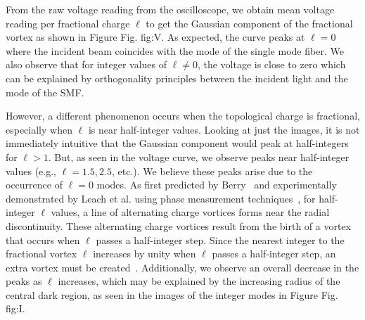 \documentclass[10pt,a4paper,twoside]{article}
\renewcommand{\l}{\ell}
\renewcommand{\ref}[1]{Fig. #1}
\begin{document}
From the raw voltage reading from the oscilloscope, we obtain mean voltage reading per fractional charge $\ell$ to get the Gaussian component of the fractional vortex as shown in Figure \ref{fig:V}. As expected, the curve peaks at $\ell = 0$ where the incident beam coincides with the mode of the single mode fiber. We also observe that for integer values of $\ell \neq 0$, the voltage is close to zero which can be explained by orthogonality principles between the incident light and the mode of the SMF. %

However, a different phenomenon occurs when the topological charge is fractional, especially when $\ell$ is near half-integer values. Looking at just the images, it is not immediately intuitive that the Gaussian component would peak at half-integers for $\ell > 1$. But, as seen in the voltage curve, we observe peaks near half-integer values (e.g., $\ell = 1.5, 2.5$, etc.). We believe these peaks arise due to the occurrence of $\ell = 0$ modes. As first predicted by Berry~\cite{Berry} and experimentally demonstrated by Leach et al. using phase measurement techniques~\cite{leach2004observation}, for half-integer $\ell$ values, a line of alternating charge vortices forms near the radial discontinuity. These alternating charge vortices result from the birth of a vortex that occurs when $\ell$ passes a half-integer step. Since the nearest integer to the fractional vortex $\ell$ increases by unity when $\ell$ passes a half-integer step, an extra vortex must be created~\cite{Berry}. Additionally, we observe an overall decrease in the peaks as $\ell$ increases, which may be explained by the increasing radius of the central dark region, as seen in the images of the integer modes in Figure \ref{fig:I}.



\end{document}
